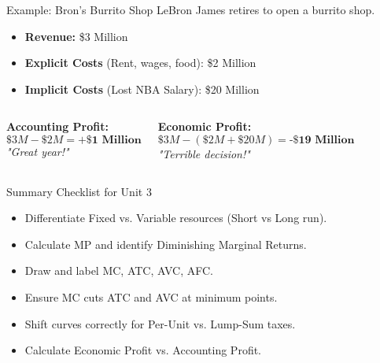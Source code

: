 \documentclass[aspectratio=169]{beamer}
\begin{document}
\begin{frame}{Example: Bron's Burrito Shop}
    LeBron James retires to open a burrito shop.
    \begin{itemize}
        \item \textbf{Revenue:} \$3 Million
        \item \textbf{Explicit Costs} (Rent, wages, food): \$2 Million
        \item \textbf{Implicit Costs} (Lost NBA Salary): \$20 Million
    \end{itemize}
    
    \vspace{0.5cm}
    
    \begin{columns}
        \textbf{Accounting Profit:}
        \[ \$3M - \$2M = \textbf{+\$1 Million} \]
        \textit{"Great year!"}
        
        \textbf{Economic Profit:}
        \[ \$3M - (\$2M + \$20M) = \textbf{-\$19 Million} \]
        \textit{"Terrible decision!"}
    \end{columns}
\end{frame}

\begin{frame}{Summary Checklist for Unit 3}
    \begin{itemize}
        \item[$\square$] Differentiate Fixed vs. Variable resources (Short vs Long run).
        \item[$\square$] Calculate MP and identify Diminishing Marginal Returns.
        \item[$\square$] Draw and label MC, ATC, AVC, AFC.
        \item[$\square$] Ensure MC cuts ATC and AVC at minimum points.
        \item[$\square$] Shift curves correctly for Per-Unit vs. Lump-Sum taxes.
        \item[$\square$] Calculate Economic Profit vs. Accounting Profit.
    \end{itemize}
\end{frame}
\end{document}
